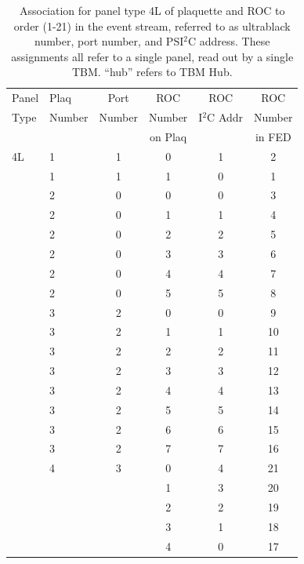 \documentclass{cmspaper}
\begin{document}
\begin{appendix}
\begin{table}[htb]
    \caption{
Association for panel type 4L of plaquette and ROC to order
(1-21)  in the event stream, referred to as ultrablack number, port number, 
and PSI$^{2}$C address. These assignments all refer to a single panel, read 
out by a single TBM. ``hub'' refers to TBM Hub.
}
    \label{table:plaq_fed_4L}
    \begin{center}
      \begin{tabular}{l|l|cccc} \hline
Panel & Plaq & Port & ROC & ROC & ROC \\
Type  & Number & Number & Number & I$^2$C Addr & Number \\
      &        &        & on Plaq &            & in FED \\ \hline
4L & 1 & 1 &  0 & 1 &  2 \\
   & 1 & 1 &  1 & 0 &  1 \\
   & 2 & 0 &  0 & 0 &  3 \\
   & 2 & 0 &  1 & 1 &  4 \\
   & 2 & 0  & 2 & 2 &  5 \\
   & 2 & 0  & 3 & 3 &  6 \\
   & 2 & 0  & 4 & 4 &  7 \\
   & 2 & 0  & 5 & 5 &  8 \\
   & 3 & 2 &  0 & 0 &  9 \\
   & 3 & 2 &  1 & 1 & 10 \\
   & 3 & 2 &  2 & 2 & 11 \\
   & 3 & 2 &  3 & 3 & 12 \\
   & 3 & 2 &  4 & 4 & 13 \\
   & 3 & 2 &  5 & 5 & 14 \\
   & 3 & 2 &  6 & 6 & 15 \\
   & 3 & 2 &  7 & 7 & 16 \\
   & 4 & 3 &  0 & 4 &  21 \\
   &   &   &  1 & 3 &  20 \\
   &   &   &  2 & 2 &  19 \\
   &   &   &  3 & 1 &  18 \\
   &   &   &  4 & 0 &  17 \\
      \end{tabular}
    \end{center}
  \end{table}



\end{appendix}
\end{document}
